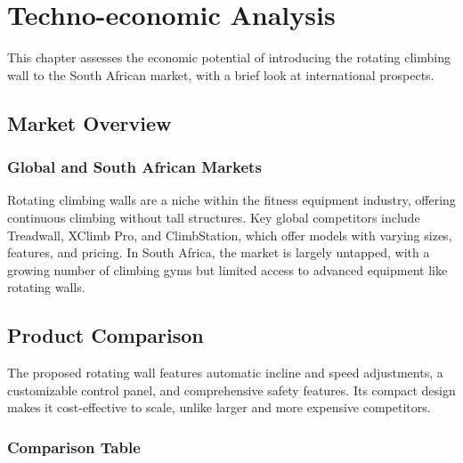 \chapter{Techno-economic Analysis}
\label{chap:techno_economic_analysis}

This chapter assesses the economic potential of introducing the rotating climbing wall to the South African market, with a brief look at international prospects.

\section{Market Overview}

\subsection{Global and South African Markets}

Rotating climbing walls are a niche within the fitness equipment industry, offering continuous climbing without tall structures. Key global competitors include Treadwall, XClimb Pro, and ClimbStation, which offer models with varying sizes, features, and pricing. In South Africa, the market is largely untapped, with a growing number of climbing gyms but limited access to advanced equipment like rotating walls.

\section{Product Comparison}

The proposed rotating wall features automatic incline and speed adjustments, a customizable control panel, and comprehensive safety features. Its compact design makes it cost-effective to scale, unlike larger and more expensive competitors.

\subsection{Comparison Table}


